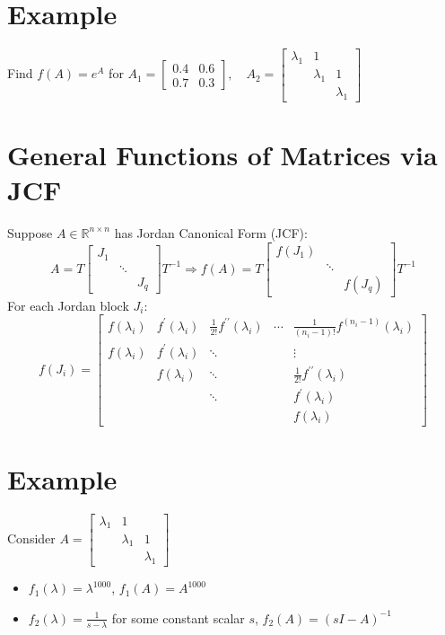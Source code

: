 \documentclass[10pt,a4paper,oneside]{article}
\begin{document}
\section{Example}
Find $f(A)=e^{A}$ for $A_{1}=\left[\begin{array}{cc}{0.4} & {0.6} \\ {0.7} & {0.3}\end{array}\right], \quad A_{2}=\left[\begin{array}{ccc}{\lambda_{1}} & {1} & {} \\ {} & {\lambda_{1}} & {1} \\ {} & {} & {\lambda_{1}}\end{array}\right]$
\section{General Functions of Matrices via JCF}
Suppose $A \in \mathbb{R}^{n \times n}$ has Jordan Canonical Form (JCF):
\[
A=T\left[\begin{array}{lll}{J_{1}} & {} & {} \\ {} & {\ddots} & {} \\ {} & {} & {J_{q}}\end{array}\right] T^{-1} \Rightarrow f(A)=T\left[\begin{array}{lll}{f\left(J_{1}\right)} & {} & {} \\ {} & {\ddots} & {} \\ {} & {} & {f\left(J_{q}\right)}\end{array}\right] T^{-1}
\]
For each Jordan block $J_i$:
\[
f(J_i)=\left[\begin{array}{ccccc}{f\left(\lambda_{i}\right)} &{f^{\prime}\left(\lambda_{i}\right)}&{\frac{1}{2 !}f^{\prime\prime}\left(\lambda_{i}\right)}&\cdots&{\frac{1}{(n_i-1)!}f^{(n_i-1)}(\lambda_i)}\\{f\left(\lambda_{i}\right)} & {f^{\prime}\left(\lambda_{i}\right)} & {\ddots}  &{}& {\vdots} \\ {} & {f\left(\lambda_{i}\right)} & {\ddots} &{}& {\frac{1}{2 !} f^{\prime \prime}\left(\lambda_{i}\right)} \\ {} & {} & {\ddots} &{}& {f^{\prime}\left(\lambda_{i}\right)} \\ {} & {} & {} &{}& {f\left(\lambda_{i}\right)}\end{array}\right]
\]
\section{Example}
Consider $A=\left[\begin{array}{lll}{\lambda_{1}} & {1} \\ {} & {\lambda_{1}} & {1} \\ {} & {} & {\lambda_{1}}\end{array}\right]$
\begin{itemize}
\item $f_{1}(\lambda)=\lambda^{1000}$, $f_{1}(A)=A^{1000}$
\item $f_{2}(\lambda)=\frac{1}{s-\lambda}$ for some constant scalar $s$, $f_{2}(A)=(sI-A)^{-1}$

\end{itemize}
\end{document}
